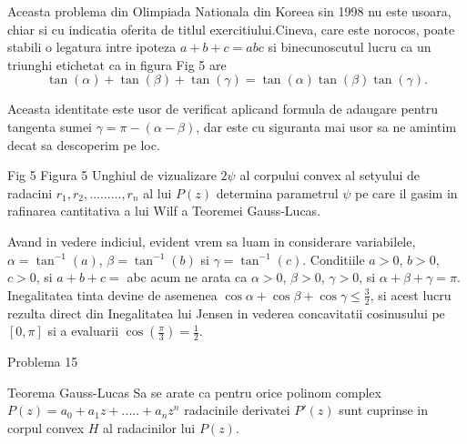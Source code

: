 \documentclass[a4paper,12pt,oneside]{report}
\begin{document}
Aceasta problema din Olimpiada Nationala din Koreea sin 1998 nu este usoara, chiar si cu indicatia oferita de titlul exercitiului.Cineva, care este norocos, poate stabili o legatura intre  ipoteza \(a + b + c = abc\) si binecunoscutul lucru ca un triunghi etichetat ca in figura Fig 5 
 are 
 \begin{displaymath}
   \tan\left ( \alpha  \right ) + \tan\left ( \beta   \right ) + \tan\left ( \gamma   \right ) = \tan\left ( \alpha  \right )\tan\left ( \beta   \right )\tan\left ( \gamma   \right ). 
 \end{displaymath}

Aceasta identitate este usor de verificat aplicand formula de adaugare pentru tangenta sumei \(\gamma  = \pi  - \left ( \alpha  - \beta  \right )\), dar este cu siguranta mai usor sa ne amintim decat sa descoperim pe loc. 


Fig 5
Figura 5  Unghiul de vizualizare \(2\psi\) al corpului convex al setyului de radacini \(r_{1} , r_{2} , ........., r_{n}\) al lui \(P\left ( z \right )\) determina parametrul \(\psi\) pe care il gasim in rafinarea cantitativa a lui Wilf a Teoremei Gauss-Lucas. 

Avand in vedere indiciul, evident vrem sa luam in considerare variabilele,  \(\alpha  = \tan^{-1}\left ( a \right )\), \(\beta = \tan ^{-1}\left ( b \right )\) si \(\gamma  = \tan ^{-1}\left ( c \right )\). Conditiile \(a> 0\), \(b> 0\), \(c> 0\), si \(a+b+c =\) abc acum ne arata ca \(\alpha > 0 \), \(\beta > 0 \), \(\gamma > 0\), si \(\alpha + \beta + \gamma  = \pi\). Inegalitatea tinta devine de asemenea \(\cos \alpha  + \cos \beta  + \cos \gamma  \leq \frac{3}{2}\), si acest lucru rezulta direct din Inegalitatea lui Jensen  in vederea concavitatii cosinusului pe \(\left [ 0 , \pi  \right ]\)  si a evaluarii \(\cos \left ( \frac{\pi }{3} \right ) = \frac{1}{2}\). 

Problema 15 

Teorema Gauss-Lucas
Sa se arate ca pentru orice polinom complex \(P\left ( z \right ) = a_{0} + a_{1}z + ..... +a_{n}z^{n}\) radacinile derivatei \({P}'\left ( z \right )\) sunt cuprinse in corpul convex \(H\) al radacinilor lui \(P\left ( z \right )\). 
\end{document}
